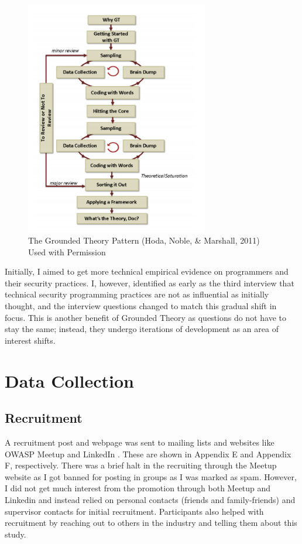 \begin{figure}[ht]
\includegraphics[width=8cm]{figures/fig1.png}
\centering
\caption{The Grounded Theory Pattern (Hoda, Noble, \& Marshall, 2011) Used with Permission \cite{geeks}}
\centering
\end{figure}

\par Initially, I aimed to get more technical empirical evidence on programmers and their security practices. I, however, identified as early as the third interview that technical security programming practices are not as influential as initially thought, and the interview questions changed to match this gradual shift in focus. This is another benefit of Grounded Theory as questions do not have to stay the same; instead, they undergo iterations of development as an area of interest shifts.  


\section{Data Collection} 

\subsection{Recruitment}
\par A recruitment post and webpage was sent to mailing lists and websites like OWASP Meetup and LinkedIn \cite{webpage}. These are shown in Appendix E and Appendix F, respectively. There was a brief halt in the recruiting through the Meetup website as I got banned for posting in groups as I was marked as spam. However, I did not get much interest from the promotion through both Meetup and Linkedin and instead relied on personal contacts (friends and family-friends) and supervisor contacts for initial recruitment. Participants also helped with recruitment by reaching out to others in the industry and telling them about this study. 

